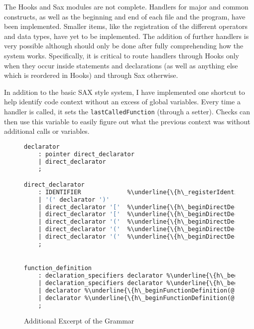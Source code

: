 \documentclass[12pt]{report}
\begin{document}
The Hooks and Sax modules are not complete. Handlers for major and common constructs, as well as 
the beginning and end of each file and the program, have been implemented. Smaller items, like the 
registration of the different operators and data types, have yet to be implemented. The addition of further 
handlers is very possible although should only be done after fully comprehending how the system 
works. Specifically, it is critical to route handlers through Hooks only when they occur inside statements 
and declarations (as well as anything else which is reordered in Hooks) and through Sax otherwise.

In addition to the basic SAX style system, I have implemented one shortcut to help identify code context 
without an excess of global variables. Every time a handler is called, it sets the 
\lstinline{lastCalledFunction} (through a setter). Checks can then use this variable to easily figure out 
what the previous context was without additional calls or variables.

\begin{figure}
\begin{lstlisting}[language=Caml, escapechar=\%]
declarator
	: pointer direct_declarator
	| direct_declarator
	;

direct_declarator
	: IDENTIFIER			 %\underline{\{h\_registerIdentifier(@\$);\}}%
	| '(' declarator ')'
	| direct_declarator '['  %\underline{\{h\_beginDirectDeclarator(@1);\}}% constant_expression ']'	 %\underline{\{h\_endDirectDeclarator(@\$);\}}%
	| direct_declarator '['  %\underline{\{h\_beginDirectDeclarator(@1);\}}% ']'						%\underline{\{h\_endDirectDeclarator(@\$);\}}%
	| direct_declarator '('  %\underline{\{h\_beginDirectDeclarator(@1);\}}% parameter_type_list ')'	%\underline{\{h\_endDirectDeclarator(@\$);\}}%
	| direct_declarator '('  %\underline{\{h\_beginDirectDeclarator(@1);\}}% identifier_list ')'		%\underline{\{h\_endDirectDeclarator(@\$);\}}%
	| direct_declarator '('  %\underline{\{h\_beginDirectDeclarator(@1);\}}% ')'						%\underline{\{h\_endDirectDeclarator(@\$);\}}%
	;


function_definition
	: declaration_specifiers declarator %\underline{\{h\_beginFunctionDefinition(@2);\}}% declaration_list compound_statement %\underline{\{endFunctionDefinition(@\$);\}}%
	| declaration_specifiers declarator %\underline{\{h\_beginFunctionDefinition(@2);\}}%} compound_statement %\underline{\{endFunctionDefinition(@\$);\}}%
	| declarator %\underline{\{h\_beginFunctionDefinition(@1);\}}% declaration_list compound_statement %\underline{\{endFunctionDefinition(@\$);\}}%
	| declarator %\underline{\{h\_beginFunctionDefinition(@1);\}}% compound_statement %\underline{\{endFunctionDefinition(@\$);\}}
	;
\end{lstlisting}
\caption{Additional Excerpt of the Grammar}
\label{hookGrammar}
\end{figure}
\end{document}
